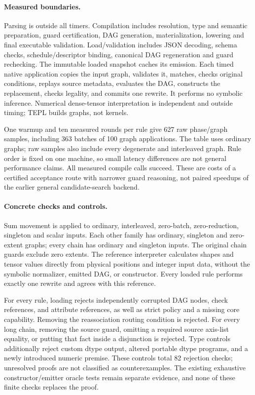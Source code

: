\paragraph{Measured boundaries.}
Parsing is outside all timers. Compilation includes resolution, type and semantic
preparation, guard certification, DAG generation, materialization, lowering and
final executable validation. Load/validation includes JSON decoding, schema checks,
schedule/descriptor binding, canonical DAG regeneration and guard rechecking.
The immutable loaded snapshot caches its emission. Each timed native application
copies the input graph, validates it, matches, checks original conditions, replays
source metadata, evaluates the DAG, constructs the replacement, checks legality,
and commits one rewrite. It performs no symbolic inference. Numerical dense-tensor
interpretation is independent and outside timing; TEPL builds graphs, not kernels.

One warmup and ten measured rounds per rule give 627 raw phase/graph samples,
including 363 batches of 100 graph applications. The table uses ordinary graphs;
raw samples also include every degenerate and interleaved graph. Rule order is
fixed on one machine, so small latency differences are not general performance
claims. All measured compile calls succeed. These are costs of a certified
acceptance route with narrower guard reasoning, not paired speedups of the
earlier general candidate-search backend.

\paragraph{Concrete checks and controls.}
Sum movement is applied to ordinary, interleaved, zero-batch, zero-reduction,
singleton and scalar inputs. Each other family has ordinary, singleton and
zero-extent graphs; every chain has ordinary and singleton inputs. The original
chain guards exclude zero extents. The reference interpreter calculates shapes
and tensor values directly from physical positions and integer input data,
without the symbolic normalizer, emitted DAG, or constructor. Every loaded rule
performs exactly one rewrite and agrees with this reference.

For every rule, loading rejects independently corrupted DAG nodes, check
references, and attribute references, as well as strict policy and a missing
core capability. Removing the reassociation routing condition is rejected.
For every long chain, removing the source guard, omitting a required source
axis-list equality, or putting that fact inside a disjunction is rejected.
Type controls additionally reject custom dtype output, altered portable dtype
programs, and a newly introduced numeric premise.
These controls total 82 rejection checks; unresolved proofs are not classified
as counterexamples. The existing exhaustive constructor/emitter oracle tests
remain separate evidence, and none of these finite checks replaces the proof.

